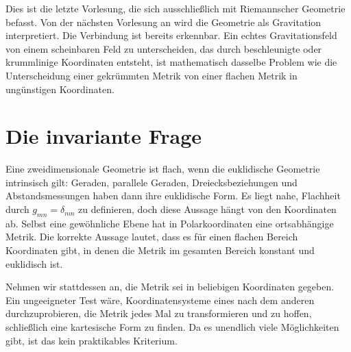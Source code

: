 \begin{classroomqa}
\end{classroomqa}

Dies ist die letzte Vorlesung, die sich ausschließlich mit Riemannscher Geometrie befasst. Von der nächsten Vorlesung an wird die Geometrie als Gravitation interpretiert. Die Verbindung ist bereits erkennbar. Ein echtes Gravitationsfeld von einem scheinbaren Feld zu unterscheiden, das durch beschleunigte oder krummlinige Koordinaten entsteht, ist mathematisch dasselbe Problem wie die Unterscheidung einer gekrümmten Metrik von einer flachen Metrik in ungünstigen Koordinaten.

\section{Die invariante Frage}

Eine zweidimensionale Geometrie ist flach, wenn die euklidische Geometrie intrinsisch gilt: Geraden, parallele Geraden, Dreiecksbeziehungen und Abstandsmessungen haben dann ihre euklidische Form. Es liegt nahe, Flachheit durch \(g_{mn}=\delta_{mn}\) zu definieren, doch diese Aussage hängt von den Koordinaten ab. Selbst eine gewöhnliche Ebene hat in Polarkoordinaten eine ortsabhängige Metrik. Die korrekte Aussage lautet, dass es für einen flachen Bereich Koordinaten gibt, in denen die Metrik im gesamten Bereich konstant und euklidisch ist.

Nehmen wir stattdessen an, die Metrik sei in beliebigen Koordinaten gegeben. Ein ungeeigneter Test wäre, Koordinatensysteme eines nach dem anderen durchzuprobieren, die Metrik jedes Mal zu transformieren und zu hoffen, schließlich eine kartesische Form zu finden. Da es unendlich viele Möglichkeiten gibt, ist das kein praktikables Kriterium.

